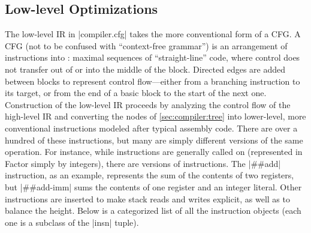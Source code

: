 \subsection{Low-level Optimizations}\label{sec:compiler:cfg}

The low-level \gls{IR} in \factor|compiler.cfg| takes the more conventional
form of a \gls{CFG}.  A \gls{CFG} (not to be confused with ``context-free
grammar'') is an arrangement of instructions into : maximal
sequences of ``straight-line'' code, where control does not transfer out of or
into the middle of the block.  Directed edges are added between blocks to
represent control flow---either from a branching instruction to its target, or
from the end of a basic block to the start of the next one.
Construction of the low-level \gls{IR} proceeds by analyzing the control flow
of the high-level \gls{IR} and converting the nodes of \cref{sec:compiler:tree}
into lower-level, more conventional instructions modeled after typical assembly
code.  There are over a hundred of these instructions, but many are simply
different versions of the same operation.  For instance, while instructions are
generally called on  (represented in Factor simply by
integers), there are  versions of instructions.  The
\factor|##add| instruction, as an example, represents the sum of the contents
of two registers, but \factor|##add-imm| sums the contents of one register and
an integer literal.  Other instructions are inserted to make stack reads and
writes explicit, as well as to balance the height.  Below is a categorized list
of all the instruction objects (each one is a subclass of the \factor|insn|
tuple).






